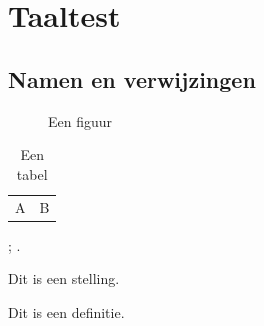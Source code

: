 \documentclass[nl, font = none, mode = simple]{elegantbook-l3}
\begin{document}
\frontmatter
\tableofcontents

\mainmatter
\chapter{Taaltest}
\section{Namen en verwijzingen}

\begin{figure}[htbp]
  \centering
  \fbox{\rule{0pt}{2cm}\rule{3cm}{0pt}}
  \caption{Een figuur}\label{fig:language-test}
\end{figure}

\begin{table}[htbp]
  \centering
  \caption{Een tabel}\label{tab:language-test}
  \begin{tabular}{cc}
    A & B
  \end{tabular}
\end{table}

; .

\begin{theorem}[Voorbeeld]
  Dit is een stelling.
\end{theorem}

\begin{definition}
  Dit is een definitie.
\end{definition}
\end{document}

